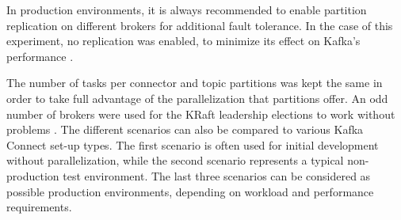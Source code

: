 In production environments, it is always recommended to enable partition replication on different brokers for additional fault tolerance. In the case of this experiment, no replication was enabled, to minimize its effect on Kafka's performance \cite{dobbelaerekafkavsrabbitmq}.

The number of tasks per connector and topic partitions was kept the same in order to take full advantage of the parallelization that partitions offer. An odd number of brokers were used for the KRaft leadership elections to work without problems \cite{kraftconfluentdocumentation}. The different scenarios can also be compared to various Kafka Connect set-up types. The first scenario is often used for initial development without parallelization, while the second scenario represents a typical non-production test environment. The last three scenarios can be considered as possible production environments, depending on workload and performance requirements. %




